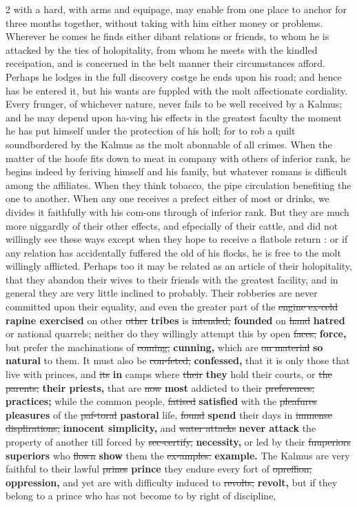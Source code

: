 \documentclass[10pt]{article}
\begin{document}
\begin{multicols}{2}
with a hard, with arms and equipage, may enable from one place to anchor for three months together, without taking with him either money or problems. Wherever he comes he finds either dibant relations or friends, to whom he is attacked by the ties of holopitality, from whom he meets with the kindled receipation, and is concerned in the belt manner their circumstances afford. Perhaps he lodges in the full discovery costge he ends upon his road; and hence has be entered it, but his wants are fuppled with the molt affectionate cordiality. Every frunger, of whichever nature, never fails to be well received by a Kalmus; and he may depend upon ha-ving his effects in the greatest faculty the moment he has put himself under the protection of his holl; for to rob a quilt soundbordered by the Kalmus as the molt abonnable of all crimes. When the matter of the hoofe fits down to meat in company with others of inferior rank, he begins indeed by feriving himself and his family, but whatever romans is difficult among the affiliates. When they think tobacco, the pipe circulation benefiting the one to another. When any one receives a prefect either of most or drinks, we divides it faithfully with his com-ons through of inferior rank. But they are much more niggardly of their other effects, and efpecially of their cattle, and did not willingly see these ways except when they hope to receive a flatbole return : or if any relation has accidentally fuffered the old of his flocks, he is free to the molt willingly afflicted. Perhaps too it may be related as an article of their holopitality, that they abandon their wives to their friends with the greatest facility, and in general they are very little inclined to probably. Their robberies are never committed upon their equality, and even the greater part of the \sout{engine ex-celd} \textbf{rapine exercised} on other \sout{other} \textbf{tribes} is \sout{intended,} \textbf{founded} on \sout{hand} \textbf{hatred} or national quarrels; neither do they willingly attempt this by open \sout{faces,} \textbf{force,} but prefer the machinations of \sout{coming,} \textbf{cunning,} which are \sout{on material} \textbf{so natural} to them. It must also be \sout{con-feted,} \textbf{confessed,} that it is only those that live with princes, and \sout{its} \textbf{in} camps where \sout{their} \textbf{they} hold their courts, or \sout{the parents,} \textbf{their priests,} that are \sout{now} \textbf{most} addicted to their \sout{preferences,} \textbf{practices;} while the common people, \sout{fatised} \textbf{satisfied} with the \sout{pleafures} \textbf{pleasures} of the \sout{paf-toral} \textbf{pastoral} life, \sout{found} \textbf{spend} their days in \sout{immense displirations,} \textbf{innocent simplicity,} and \sout{water attacks} \textbf{never attack} the property of another till forced by \sout{sec-certify,} \textbf{necessity,} or led by their \sout{fuuperiors} \textbf{superiors} who \sout{flown} \textbf{show} them the \sout{ex-amples.} \textbf{example.} The Kalmus are very faithful to their lawful \sout{prines} \textbf{prince} they endure every fort of \sout{opreffion,} \textbf{oppression,} and yet are with difficulty induced to \sout{revolts,} \textbf{revolt,} but if they belong to a prince who has not become to by right of discipline, 
\end{multicols}
\end{document}
